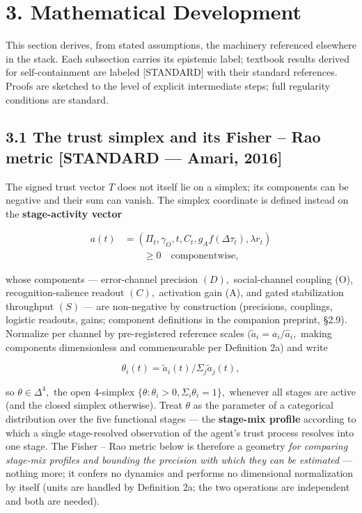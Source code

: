 \documentclass[11pt,twocolumn]{article}
\theoremstyle{gttdef}
\theoremstyle{gttplain}
\begin{document}
\section*{3. Mathematical Development}

This section derives, from stated assumptions, the machinery referenced elsewhere in the stack. Each subsection carries its epistemic label; textbook results derived for self-containment are labeled [STANDARD] with their standard references. Proofs are sketched to the level of explicit intermediate steps; full regularity conditions are standard.

\subsection*{3.1 The trust simplex and its Fisher -- Rao metric [STANDARD --- Amari, 2016]}

The signed trust vector $T$ does not itself lie on a simplex; its components can be negative and their sum can vanish. The simplex coordinate is defined instead on the \textbf{stage-activity vector}

\begin{equation}
\begin{split}
a(t) &= ( \Pi_t, \gamma_O,t, C_t, g_A f(\Delta \tau_t), \lambda r_t )\\
&\qquad \geq 0 \quad \text{componentwise,}
\end{split}
\label{eq:activity}
\end{equation}

whose components --- error-channel precision $(D),$ social-channel coupling (O), recognition-salience readout $(C),$ activation gain (A), and gated stabilization throughput $(S)$ --- are non-negative by construction (precisions, couplings, logistic readouts, gains; component definitions in the companion preprint, \S{}2.9). Normalize per channel by pre-registered reference scales $(\tilde{a}_i = a_i/\hat{a}_i,$ making components dimensionless and commensurable per Definition 2a) and write

\begin{equation}
\theta_i(t) = \tilde{a}_i(t) / \Sigma_j \tilde{a}_j(t),
\label{eq:theta}
\end{equation}

so $\theta \in \Delta^{4},$ the open 4-simplex $\{\theta : \theta_i > 0, \Sigma_i \theta_i = 1\},$ whenever all stages are active (and the closed simplex otherwise). Treat $\theta$ as the parameter of a categorical distribution over the five functional stages --- the \textbf{stage-mix profile} according to which a single stage-resolved observation of the agent's trust process resolves into one stage. The Fisher -- Rao metric below is therefore a geometry \emph{for comparing stage-mix profiles and bounding the precision with which they can be estimated} --- nothing more; it confers no dynamics and performs no dimensional normalization by itself (units are handled by Definition 2a; the two operations are independent and both are needed).
\end{document}

